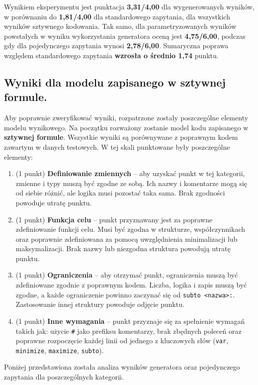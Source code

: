 Wynikiem eksperymentu jest punktacja \textbf{3,31/4,00} dla wygenerowanych wyników, w porównaniu do \textbf{1,81/4,00} dla standardowego zapytania, dla wszystkich wyników sztywnego kodowania. Tak samo, dla parametryzowanych wyników powstałych w wyniku wykorzystania generatora oceną jest \textbf{4,75/6,00}, podczas gdy dla pojedynczego zapytania wynosi \textbf{2,78/6,00}. Sumaryczna poprawa względem standardowego zapytania \textbf{wzrosła o średnio 1,74} punktu.

\subsection{Wyniki dla modelu zapisanego w sztywnej formule.}

Aby poprawnie zweryfikować wyniki, rozpatrzone zostały poszczególne elementy modelu wynikowego. Na początku rozważony zostanie model kodu zapisanego w \textbf{sztywnej formule}. Wszystkie wyniki są porównywane z poprawnym kodem zawartym w danych testowych. W tej skali punktowane były poszczególne elementy:

\begin{enumerate}
\item (1 punkt) \textbf{Definiowanie zmiennych} -- aby uzyskać punkt w tej kategorii, zmienne i typy muszą być zgodne ze sobą. Ich nazwy i komentarze mogą się od siebie różnić, ale logika musi pozostać taka sama. Brak zgodności powoduje utratę punktu.
\item (1 punkt) \textbf{Funkcja celu} -- punkt przyznawany jest za poprawne zdefiniowanie funkcji celu. Musi być zgodna w strukturze, współczynnikach oraz poprawnie zdefiniowana za pomocą uwzględnienia minimalizacji lub maksymalizacji. Brak nazwy lub niezgodna struktura powodują utratę punktu.
\item (1 punkt) \textbf{Ograniczenia} -- aby otrzymać punkt, ograniczenia muszą być zdefiniowane zgodnie z poprawnym kodem. Liczba, logika i zapis muszą być zgodne, a każde ograniczenie powinno zaczynać się od \texttt{subto <nazwa>:}. Zastosowanie innej struktury powoduje odjęcie punktu.
\item (1 punkt) \textbf{Inne wymagania} -- punkt przyznaje się za spełnienie wymagań takich jak: użycie \texttt{\#} jako prefiksu komentarzy, brak zbędnych poleceń oraz poprawne rozpoczęcie każdej linii od jednego z kluczowych słów (\texttt{var}, \texttt{minimize}, \texttt{maximize}, \texttt{subto}).
\end{enumerate}

Poniżej przedstawiona została analiza wyników generatora oraz pojedynczego zapytania dla poszczególnych kategorii.

